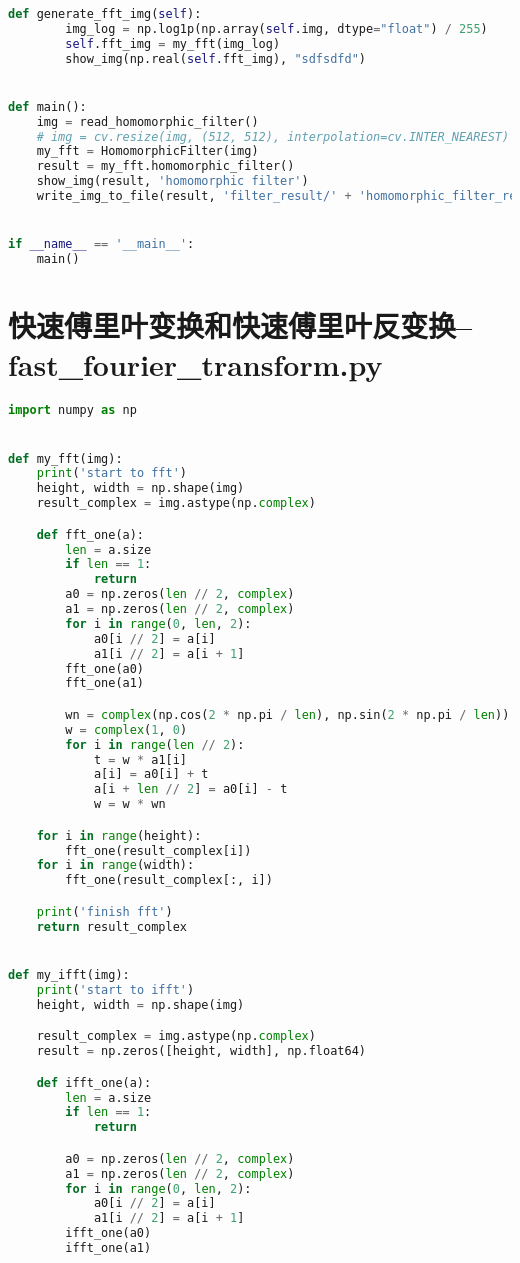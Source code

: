 \documentclass{hitreport}
\begin{document}
\begin{appendices}
\begin{lstlisting}[language=python]
    def generate_fft_img(self):
        img_log = np.log1p(np.array(self.img, dtype="float") / 255)
        self.fft_img = my_fft(img_log)
        show_img(np.real(self.fft_img), "sdfsdfd")


def main():
    img = read_homomorphic_filter()
    # img = cv.resize(img, (512, 512), interpolation=cv.INTER_NEAREST)
    my_fft = HomomorphicFilter(img)
    result = my_fft.homomorphic_filter()
    show_img(result, 'homomorphic filter')
    write_img_to_file(result, 'filter_result/' + 'homomorphic_filter_result')


if __name__ == '__main__':
    main()

\end{lstlisting}

\section{快速傅里叶变换和快速傅里叶反变换--fast\_fourier\_transform.py}\label{app:fft}
\begin{lstlisting}[language=python]
import numpy as np


def my_fft(img):
    print('start to fft')
    height, width = np.shape(img)
    result_complex = img.astype(np.complex)

    def fft_one(a):
        len = a.size
        if len == 1:
            return
        a0 = np.zeros(len // 2, complex)
        a1 = np.zeros(len // 2, complex)
        for i in range(0, len, 2):
            a0[i // 2] = a[i]
            a1[i // 2] = a[i + 1]
        fft_one(a0)
        fft_one(a1)

        wn = complex(np.cos(2 * np.pi / len), np.sin(2 * np.pi / len))
        w = complex(1, 0)
        for i in range(len // 2):
            t = w * a1[i]
            a[i] = a0[i] + t
            a[i + len // 2] = a0[i] - t
            w = w * wn

    for i in range(height):
        fft_one(result_complex[i])
    for i in range(width):
        fft_one(result_complex[:, i])

    print('finish fft')
    return result_complex


def my_ifft(img):
    print('start to ifft')
    height, width = np.shape(img)

    result_complex = img.astype(np.complex)
    result = np.zeros([height, width], np.float64)

    def ifft_one(a):
        len = a.size
        if len == 1:
            return

        a0 = np.zeros(len // 2, complex)
        a1 = np.zeros(len // 2, complex)
        for i in range(0, len, 2):
            a0[i // 2] = a[i]
            a1[i // 2] = a[i + 1]
        ifft_one(a0)
        ifft_one(a1)


\end{lstlisting}
\end{appendices}
\end{document}
